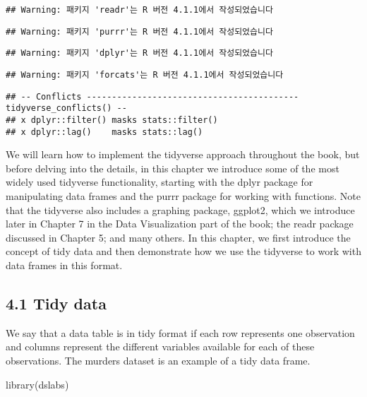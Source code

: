 \documentclass[
]{article}
\newenvironment{Shaded}{\begin{snugshade}}{\end{snugshade}}
\newcommand{\FunctionTok}[1]{\textcolor[rgb]{0.00,0.00,0.00}{#1}}
\newcommand{\NormalTok}[1]{#1}
\begin{document}
\begin{verbatim}
## Warning: 패키지 'readr'는 R 버전 4.1.1에서 작성되었습니다
\end{verbatim}

\begin{verbatim}
## Warning: 패키지 'purrr'는 R 버전 4.1.1에서 작성되었습니다
\end{verbatim}

\begin{verbatim}
## Warning: 패키지 'dplyr'는 R 버전 4.1.1에서 작성되었습니다
\end{verbatim}

\begin{verbatim}
## Warning: 패키지 'forcats'는 R 버전 4.1.1에서 작성되었습니다
\end{verbatim}

\begin{verbatim}
## -- Conflicts ------------------------------------------ tidyverse_conflicts() --
## x dplyr::filter() masks stats::filter()
## x dplyr::lag()    masks stats::lag()
\end{verbatim}

We will learn how to implement the tidyverse approach throughout the
book, but before delving into the details, in this chapter we introduce
some of the most widely used tidyverse functionality, starting with the
dplyr package for manipulating data frames and the purrr package for
working with functions. Note that the tidyverse also includes a graphing
package, ggplot2, which we introduce later in Chapter 7 in the Data
Visualization part of the book; the readr package discussed in Chapter
5; and many others. In this chapter, we first introduce the concept of
tidy data and then demonstrate how we use the tidyverse to work with
data frames in this format.

\hypertarget{tidy-data}{%
\subsection{4.1 Tidy data}\label{tidy-data}}

We say that a data table is in tidy format if each row represents one
observation and columns represent the different variables available for
each of these observations. The murders dataset is an example of a tidy
data frame.

\begin{Shaded}
\begin{Highlighting}[]
\FunctionTok{library}\NormalTok{(dslabs)}
\end{Highlighting}
\end{Shaded}
\end{document}
